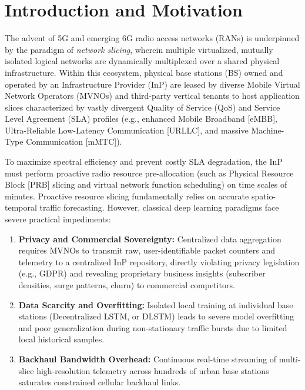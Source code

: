 \documentclass[10pt,journal,compsoc,twocolumn]{article}
\begin{document}
\section{Introduction and Motivation}
The advent of 5G and emerging 6G radio access networks (RANs) is underpinned by the paradigm of \textit{network slicing}, wherein multiple virtualized, mutually isolated logical networks are dynamically multiplexed over a shared physical infrastructure. Within this ecosystem, physical base stations (BS) owned and operated by an Infrastructure Provider (InP) are leased by diverse Mobile Virtual Network Operators (MVNOs) and third-party vertical tenants to host application slices characterized by vastly divergent Quality of Service (QoS) and Service Level Agreement (SLA) profiles (e.g., enhanced Mobile Broadband [eMBB], Ultra-Reliable Low-Latency Communication [URLLC], and massive Machine-Type Communication [mMTC]).

To maximize spectral efficiency and prevent costly SLA degradation, the InP must perform proactive radio resource pre-allocation (such as Physical Resource Block [PRB] slicing and virtual network function scheduling) on time scales of minutes. Proactive resource slicing fundamentally relies on accurate spatio-temporal traffic forecasting. However, classical deep learning paradigms face severe practical impediments:
\begin{enumerate}
    \item \textbf{Privacy and Commercial Sovereignty:} Centralized data aggregation requires MVNOs to transmit raw, user-identifiable packet counters and telemetry to a centralized InP repository, directly violating privacy legislation (e.g., GDPR) and revealing proprietary business insights (subscriber densities, surge patterns, churn) to commercial competitors.
    \item \textbf{Data Scarcity and Overfitting:} Isolated local training at individual base stations (Decentralized LSTM, or DLSTM) leads to severe model overfitting and poor generalization during non-stationary traffic bursts due to limited local historical samples.
    \item \textbf{Backhaul Bandwidth Overhead:} Continuous real-time streaming of multi-slice high-resolution telemetry across hundreds of urban base stations saturates constrained cellular backhaul links.
\end{enumerate}
\end{document}
